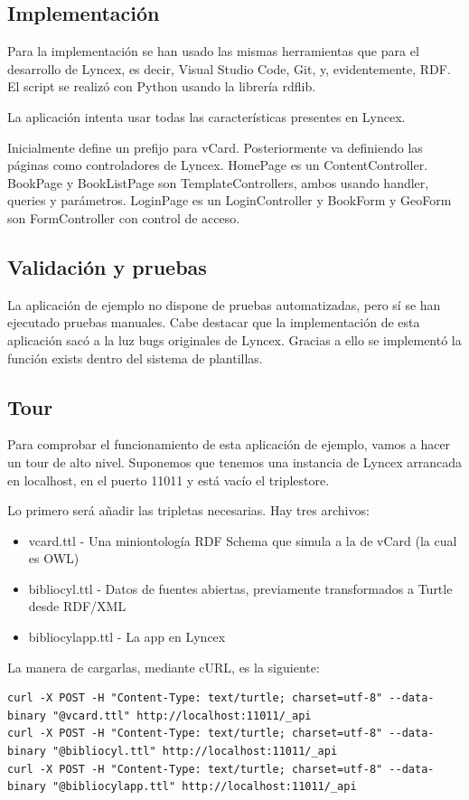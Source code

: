 \documentclass[12pt]{report} %
\begin{document}
\subsection{Implementación}

Para la implementación se han usado las mismas herramientas que para el desarrollo de Lyncex, es decir, Visual Studio Code, Git, y, evidentemente, RDF. El script se realizó con Python usando la librería rdflib.

La aplicación intenta usar todas las características presentes en Lyncex. 

Inicialmente define un prefijo para vCard. Posteriormente va definiendo las páginas como controladores de Lyncex. HomePage es un ContentController. BookPage y BookListPage son TemplateControllers, ambos usando handler, queries y parámetros. LoginPage es un LoginController y BookForm y GeoForm son FormController con control de acceso.

\subsection{Validación y pruebas} 

La aplicación de ejemplo no dispone de pruebas automatizadas, pero sí se han ejecutado pruebas manuales. Cabe destacar que la implementación de esta aplicación sacó a la luz bugs originales de Lyncex. Gracias a ello se implementó la función exists dentro del sistema de plantillas.

\subsection{Tour}

Para comprobar el funcionamiento de esta aplicación de ejemplo, vamos a hacer un tour de alto nivel. Suponemos que tenemos una instancia de Lyncex arrancada en localhost, en el puerto 11011 y está vacío el triplestore.

Lo primero será añadir las tripletas necesarias. Hay tres archivos:
\begin{itemize}
    \item vcard.ttl - Una miniontología RDF Schema que simula a la de vCard (la cual es OWL)
    \item bibliocyl.ttl - Datos de fuentes abiertas, previamente transformados a Turtle desde RDF/XML
    \item bibliocylapp.ttl - La app en Lyncex
\end{itemize}

La manera de cargarlas, mediante cURL, es la siguiente:
\begin{verbatim}
curl -X POST -H "Content-Type: text/turtle; charset=utf-8" --data-binary "@vcard.ttl" http://localhost:11011/_api
curl -X POST -H "Content-Type: text/turtle; charset=utf-8" --data-binary "@bibliocyl.ttl" http://localhost:11011/_api
curl -X POST -H "Content-Type: text/turtle; charset=utf-8" --data-binary "@bibliocylapp.ttl" http://localhost:11011/_api
\end{verbatim}
\end{document}
